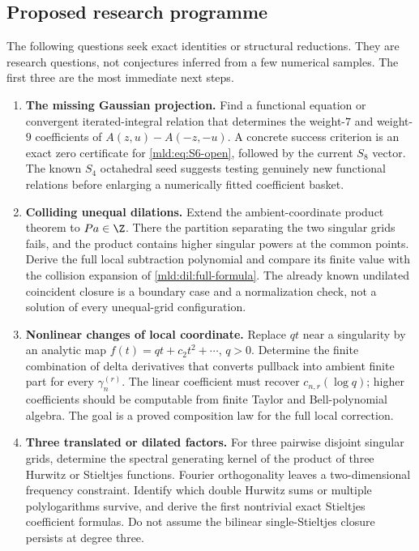 \subsection{Proposed research programme}

The following questions seek exact identities or structural reductions.
They are research questions, not conjectures inferred from a few
numerical samples. The first three are the most immediate next steps.

\begin{enumerate}[label=\textbf{Q\arabic*.},leftmargin=2.7em]
\item \textbf{The missing Gaussian projection.}
Find a functional equation or convergent iterated-integral relation that
determines the weight-$7$ and weight-$9$ coefficients of
$A(z,u)-A(-z,-u)$. A concrete success criterion is an exact zero
certificate for \eqref{mld:eq:S6-open}, followed by the current $S_8$ vector.
The known $S_4$ octahedral seed suggests testing genuinely new functional
relations before enlarging a numerically fitted coefficient basket.

\item \textbf{Colliding unequal dilations.}
Extend the ambient-coordinate product theorem to $Pa\in\Z$. There the
partition separating the two singular grids fails, and the product
contains higher singular powers at the common points. Derive the full
local subtraction polynomial and compare its finite value with the
collision expansion of \eqref{mld:dil:full-formula}. The already known
undilated coincident closure is a boundary case and a normalization
check, not a solution of every unequal-grid configuration.

\item \textbf{Nonlinear changes of local coordinate.}
Replace $qt$ near a singularity by an analytic map
$f(t)=qt+c_2t^2+\cdots$, $q>0$. Determine the finite combination of
delta derivatives that converts pullback into ambient finite part for
every $\gamma_n^{(r)}$. The linear coefficient must recover
$c_{n,r}(\log q)$; higher coefficients should be computable from finite
Taylor and Bell-polynomial algebra. The goal is a proved composition
law for the full local correction.

\item \textbf{Three translated or dilated factors.}
For three pairwise disjoint singular grids, determine the spectral
generating kernel of the product of three Hurwitz or Stieltjes
functions. Fourier orthogonality leaves a two-dimensional frequency
constraint. Identify which double Hurwitz sums or multiple
polylogarithms survive, and derive the first nontrivial exact Stieltjes
coefficient formulas. Do not assume the bilinear single-Stieltjes
closure persists at degree three.


\end{enumerate}
